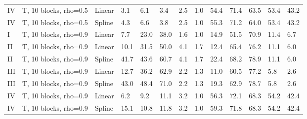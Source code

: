 \documentclass{article}\usepackage[]{graphicx}\usepackage[]{color}
\begin{document}
\begin{table}[ht]
\begin{tabular}{lll|lllll|lllll}
  IV & T, 10 blocks, rho=0.5 & Linear & 3.1 & 6.1 & 3.4 & 2.5 & 1.0 & 54.4 & 71.4 & 63.5 & 53.4 & 43.2 \\ 
  IV & T, 10 blocks, rho=0.5 & Spline & 4.3 & 6.6 & 3.8 & 2.5 & 1.0 & 55.3 & 71.2 & 64.0 & 53.4 & 43.2 \\ 
   \hline
I & T, 10 blocks, rho=0.9 & Linear & 7.7 & 23.0 & 38.0 & 1.6 & 1.0 & 14.9 & 51.5 & 70.9 & 11.4 & 6.7 \\ 
  II & T, 10 blocks, rho=0.9 & Linear & 10.1 & 31.5 & 50.0 & 4.1 & 1.7 & 12.4 & 65.4 & 76.2 & 11.1 & 6.0 \\ 
  II & T, 10 blocks, rho=0.9 & Spline & 41.7 & 43.6 & 60.7 & 4.1 & 1.7 & 22.4 & 68.2 & 78.9 & 11.1 & 6.0 \\ 
  III & T, 10 blocks, rho=0.9 & Linear & 12.7 & 36.2 & 62.9 & 2.2 & 1.3 & 11.0 & 60.5 & 77.2 & 5.8 & 2.6 \\ 
  III & T, 10 blocks, rho=0.9 & Spline & 43.0 & 48.4 & 71.0 & 2.2 & 1.3 & 19.3 & 62.9 & 78.7 & 5.8 & 2.6 \\ 
  IV & T, 10 blocks, rho=0.9 & Linear & 6.2 & 9.2 & 11.1 & 3.2 & 1.0 & 56.3 & 72.1 & 68.3 & 54.2 & 42.4 \\ 
  IV & T, 10 blocks, rho=0.9 & Spline & 15.1 & 10.8 & 11.8 & 3.2 & 1.0 & 59.3 & 71.8 & 68.3 & 54.2 & 42.4 \\ 
   \hline
\end{tabular}
\end{table}
\end{document}
